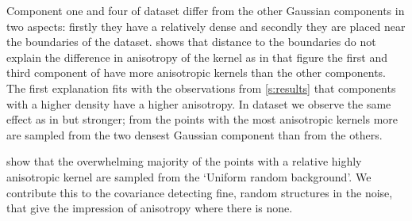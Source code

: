 				Component one and four of dataset \ferdosiThree differ from the other Gaussian components in two aspects: firstly they have a relatively dense and secondly they are placed near the boundaries of the dataset. 
					 shows that distance to the boundaries do not explain the difference in anisotropy of the kernel as in that figure the first and third component of \ferdosiThreeNoise have more anisotropic kernels than the other components.
					The first explanation fits with the observations from \cref{s:results} that components with a higher density have a higher anisotropy.
				In dataset \baakmanThree we observe the same effect as in \ferdosiThree but stronger; from the points with the most anisotropic kernels more are sampled from the two densest Gaussian component than from the others. 

		 show that the overwhelming majority of the points with a relative highly anisotropic kernel are sampled from the `Uniform random background'. We contribute this to the covariance detecting fine, random structures in the noise, that give the impression of anisotropy where there is none.

